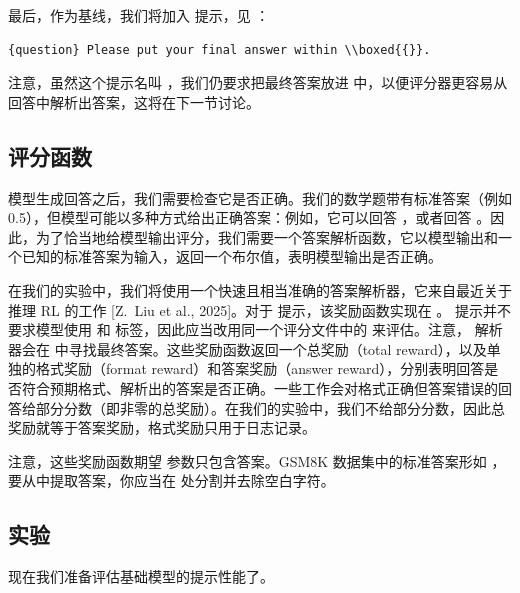 {\sloppy 最后，作为基线，我们将加入  提示，见 ：\par}

\begin{lstlisting}
{question} Please put your final answer within \\boxed{{}}.
\end{lstlisting}

注意，虽然这个提示名叫 ，我们仍要求把最终答案放进  中，以便评分器更容易从回答中解析出答案，这将在下一节讨论。

\subsection{评分函数}

模型生成回答之后，我们需要检查它是否正确。我们的数学题带有标准答案（例如 0.5），但模型可能以多种方式给出正确答案：例如，它可以回答 ，或者回答 。因此，为了恰当地给模型输出评分，我们需要一个答案解析函数，它以模型输出和一个已知的标准答案为输入，返回一个布尔值，表明模型输出是否正确。

{\sloppy 在我们的实验中，我们将使用一个快速且相当准确的答案解析器，它来自最近关于推理 RL 的工作 [Z.\ Liu et al., 2025]。对于  提示，该奖励函数实现在 。 提示并不要求模型使用  和  标签，因此应当改用同一个评分文件中的  来评估。注意， 解析器会在  中寻找最终答案。这些奖励函数返回一个总奖励（total reward），以及单独的格式奖励（format reward）和答案奖励（answer reward），分别表明回答是否符合预期格式、解析出的答案是否正确。一些工作会对格式正确但答案错误的回答给部分分数（即非零的总奖励）。在我们的实验中，我们不给部分分数，因此总奖励就等于答案奖励，格式奖励只用于日志记录。\par}

注意，这些奖励函数期望  参数只包含答案。GSM8K 数据集中的标准答案形如 ，要从中提取答案，你应当在 \tm{\#\#\#\#} 处分割并去除空白字符。

\subsection{实验}

现在我们准备评估基础模型的提示性能了。

